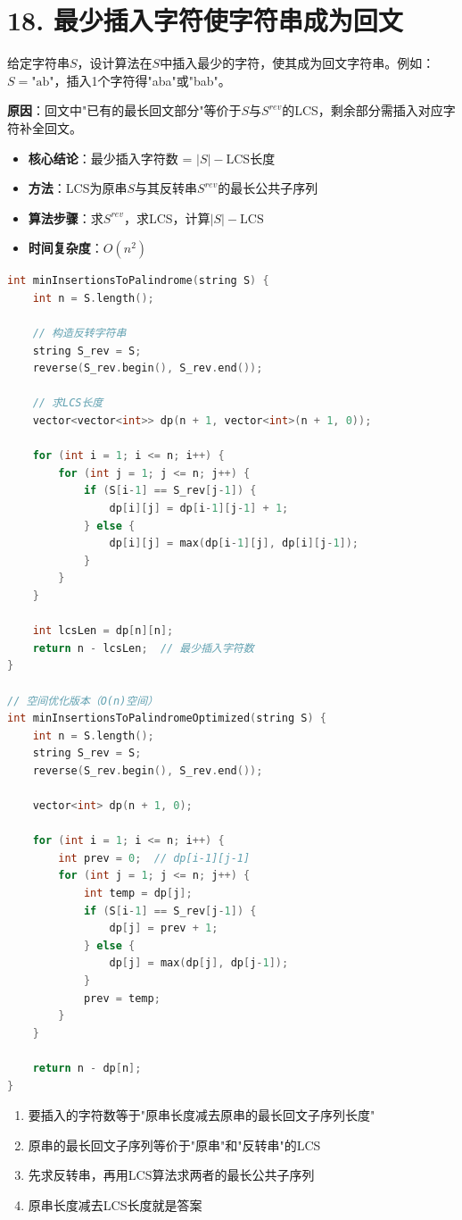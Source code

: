 \section*{18. 最少插入字符使字符串成为回文}

给定字符串$S$，设计算法在$S$中插入最少的字符，使其成为回文字符串。例如：$S=\text{"ab"}$，插入1个字符得"aba"或"bab"。

\textbf{原因}：回文中"已有的最长回文部分"等价于$S$与$S^{rev}$的LCS，剩余部分需插入对应字符补全回文。

\begin{itemize}
    \item \textbf{核心结论}：最少插入字符数 = $|S| - \text{LCS长度}$
    \item \textbf{方法}：LCS为原串$S$与其反转串$S^{rev}$的最长公共子序列
    \item \textbf{算法步骤}：求$S^{rev}$，求LCS，计算$|S| - \text{LCS}$
    \item \textbf{时间复杂度}：$O(n^2)$
\end{itemize}

\begin{lstlisting}[language=C++, style=cppstyle]
int minInsertionsToPalindrome(string S) {
    int n = S.length();

    // 构造反转字符串
    string S_rev = S;
    reverse(S_rev.begin(), S_rev.end());

    // 求LCS长度
    vector<vector<int>> dp(n + 1, vector<int>(n + 1, 0));

    for (int i = 1; i <= n; i++) {
        for (int j = 1; j <= n; j++) {
            if (S[i-1] == S_rev[j-1]) {
                dp[i][j] = dp[i-1][j-1] + 1;
            } else {
                dp[i][j] = max(dp[i-1][j], dp[i][j-1]);
            }
        }
    }

    int lcsLen = dp[n][n];
    return n - lcsLen;  // 最少插入字符数
}

// 空间优化版本（O(n)空间）
int minInsertionsToPalindromeOptimized(string S) {
    int n = S.length();
    string S_rev = S;
    reverse(S_rev.begin(), S_rev.end());

    vector<int> dp(n + 1, 0);

    for (int i = 1; i <= n; i++) {
        int prev = 0;  // dp[i-1][j-1]
        for (int j = 1; j <= n; j++) {
            int temp = dp[j];
            if (S[i-1] == S_rev[j-1]) {
                dp[j] = prev + 1;
            } else {
                dp[j] = max(dp[j], dp[j-1]);
            }
            prev = temp;
        }
    }

    return n - dp[n];
}
\end{lstlisting}


\begin{enumerate}
    \item 要插入的字符数等于"原串长度减去原串的最长回文子序列长度"
    \item 原串的最长回文子序列等价于"原串"和"反转串"的LCS
    \item 先求反转串，再用LCS算法求两者的最长公共子序列
    \item 原串长度减去LCS长度就是答案
\end{enumerate}

